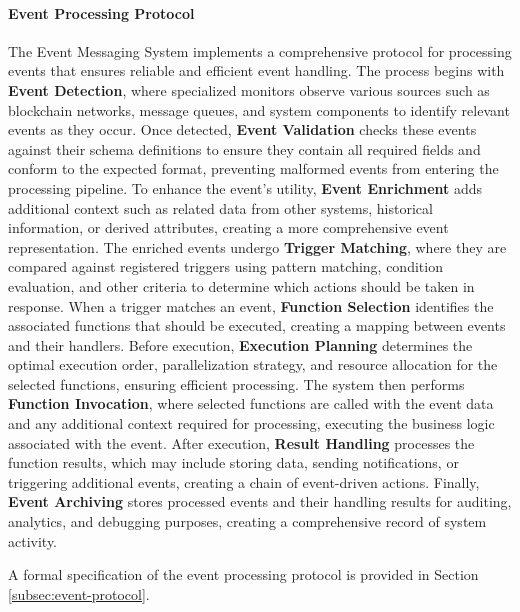 \documentclass{article}
\begin{document}
\paragraph{Event Processing Protocol}
The Event Messaging System implements a comprehensive protocol for processing events that ensures reliable and efficient event handling. The process begins with \textbf{Event Detection}, where specialized monitors observe various sources such as blockchain networks, message queues, and system components to identify relevant events as they occur. Once detected, \textbf{Event Validation} checks these events against their schema definitions to ensure they contain all required fields and conform to the expected format, preventing malformed events from entering the processing pipeline. To enhance the event's utility, \textbf{Event Enrichment} adds additional context such as related data from other systems, historical information, or derived attributes, creating a more comprehensive event representation. The enriched events undergo \textbf{Trigger Matching}, where they are compared against registered triggers using pattern matching, condition evaluation, and other criteria to determine which actions should be taken in response. When a trigger matches an event, \textbf{Function Selection} identifies the associated functions that should be executed, creating a mapping between events and their handlers. Before execution, \textbf{Execution Planning} determines the optimal execution order, parallelization strategy, and resource allocation for the selected functions, ensuring efficient processing. The system then performs \textbf{Function Invocation}, where selected functions are called with the event data and any additional context required for processing, executing the business logic associated with the event. After execution, \textbf{Result Handling} processes the function results, which may include storing data, sending notifications, or triggering additional events, creating a chain of event-driven actions. Finally, \textbf{Event Archiving} stores processed events and their handling results for auditing, analytics, and debugging purposes, creating a comprehensive record of system activity.

A formal specification of the event processing protocol is provided in Section \ref{subsec:event-protocol}.


\end{document}
